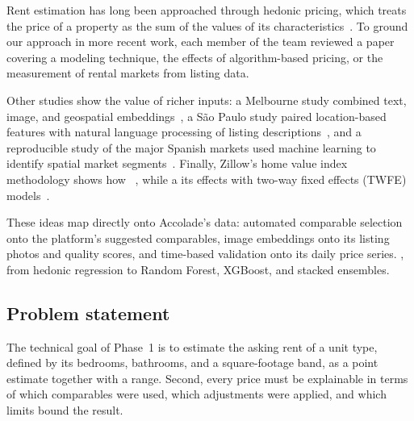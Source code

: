 Rent estimation has long been approached through hedonic pricing, which treats the price of a
property as the sum of the values of its characteristics~\autocite{rosen1974hedonic}. To ground our
approach in more recent work, each member of the team reviewed a paper covering a modeling
technique, the effects of algorithm-based pricing, or the measurement of rental markets from
listing data.

 Other studies show the value of richer inputs: a
Melbourne study combined text, image, and geospatial embeddings~\autocite{hasan2024multimodal}, a São
Paulo study paired location-based features with natural language processing of listing
descriptions~\autocite{maia2024machine}, and a reproducible study of the major Spanish markets used
machine learning to identify spatial market segments~\autocite{reyblanco2024using}. Finally,
Zillow's home value index methodology shows how ~\autocite{olsen2023zhvi}, while a  its effects with two-way fixed effects (TWFE) models~\autocite{calderwang2026algorithmic}.

These ideas map directly onto Accolade's data: automated comparable selection onto the platform's
suggested comparables, image embeddings onto its listing photos and quality scores, and time-based
validation onto its daily price series. , from hedonic
regression to Random Forest, XGBoost, and stacked ensembles.

\subsection{Problem statement}

The technical goal of Phase~1 is to estimate the asking rent of a unit type, defined by its
bedrooms, bathrooms, and a square-footage band, as a point estimate together with a range.  Second, every price must
be explainable in terms of which comparables were used, which adjustments were applied, and which
limits bound the result. 

